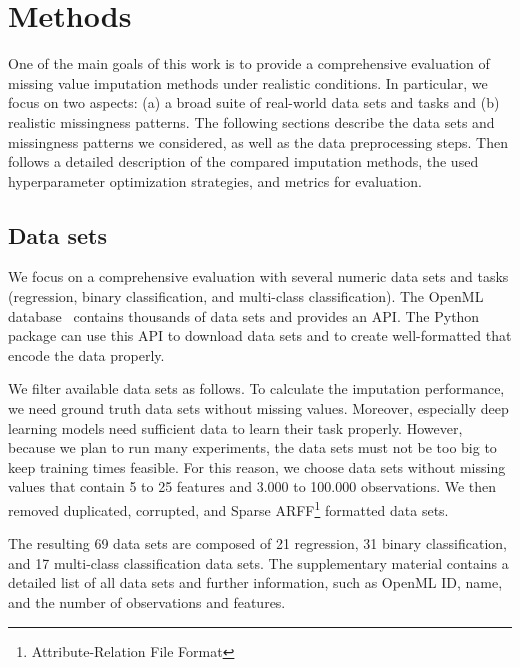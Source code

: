 
\section{Methods}
\label{sec:methods}
%
One of the main goals of this work is to provide a comprehensive evaluation of missing value imputation methods under realistic conditions. In particular, we focus on two aspects: (a) a broad suite of real-world data sets and tasks and (b) realistic missingness patterns. The following sections describe the data sets and missingness patterns we considered, as well as the data preprocessing steps. Then follows a detailed description of the compared imputation methods, the used hyperparameter optimization strategies, and metrics for evaluation.

\subsection{Data sets}
\label{sec:datasets}
%
We focus on a comprehensive evaluation with several numeric data sets and tasks (regression, binary classification, and multi-class classification). The OpenML database~\citep{OpenML2013} contains thousands of data sets and provides an API. The Python package  \citep{scikit-learn} can use this API to download data sets and to create well-formatted  that encode the data properly.

We filter available data sets as follows. To calculate the imputation performance, we need ground truth data sets without missing values. Moreover, especially deep learning models need sufficient data to learn their task properly. However, because we plan to run many experiments, the data sets must not be too big to keep training times feasible. For this reason, we choose data sets without missing values that contain 5 to 25 features and 3.000 to 100.000 observations. We then removed duplicated, corrupted, and Sparse ARFF\footnote{Attribute-Relation File Format} formatted data sets.

The resulting 69 data sets are composed of 21 regression, 31 binary classification, and 17 multi-class classification data sets. The supplementary material contains a detailed list of all data sets and further information, such as OpenML ID, name, and the number of observations and features.


